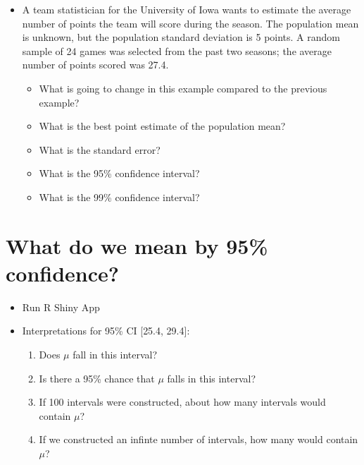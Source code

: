 \documentclass[12pt]{article}
\begin{document}
\begin{itemize}
\itemsep1pt\parskip0pt
\item
  A team statistician for the University of Iowa wants to estimate the
  average number of points the team will score during the season. The
  population mean is unknown, but the population standard deviation is 5
  points. A random sample of 24 games was selected from the past two
  seasons; the average number of points scored was 27.4.

  \begin{itemize}
  \itemsep1pt\parskip0pt
  \item
    What is going to change in this example compared to the previous
    example?
  \item
    What is the best point estimate of the population mean?\\
  \item
    What is the standard error?
  \item
    What is the 95\% confidence interval?
  \item
    What is the 99\% confidence interval?
  \end{itemize}
\end{itemize}

\section{What do we mean by 95\%
confidence?}\label{what-do-we-mean-by-95-confidence}

\begin{itemize}
\itemsep1pt\parskip0pt
\item
  Run R Shiny App
\item
  Interpretations for 95\% CI {[}25.4, 29.4{]}:

  \begin{enumerate}
  \def\labelenumi{\arabic{enumi}.}
  \itemsep1pt\parskip0pt
  \item
    Does \(\mu\) fall in this interval?
  \item
    Is there a 95\% chance that \(\mu\) falls in this interval?
  \item
    If 100 intervals were constructed, about how many intervals would
    contain \(\mu\)?
  \item
    If we constructed an infinte number of intervals, how many would
    contain \(\mu\)?
  \end{enumerate}
\end{itemize}
\end{document}
